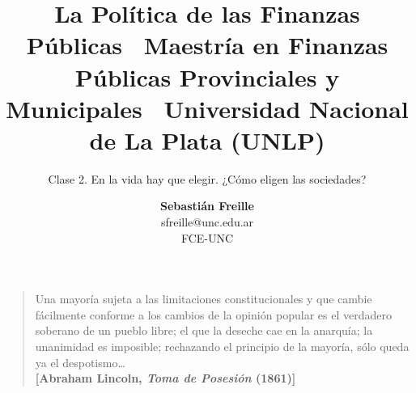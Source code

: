 \documentclass[
  ignorenonframetext,
]{beamer}
\title{La Política de las Finanzas Públicas ~Maestría en Finanzas
Públicas Provinciales y Municipales ~Universidad Nacional de La Plata
(UNLP)}
\subtitle{Clase 2. En la vida hay que elegir. ¿Cómo eligen las
sociedades?}
\author{\textbf{Sebastián Freille}\\
sfreille@unc.edu.ar\\
FCE-UNC}
\date{}
\begin{document}
\frame{\titlepage}
\ifdefined\Shaded\renewenvironment{Shaded}{\begin{tcolorbox}[borderline west={3pt}{0pt}{shadecolor}, boxrule=0pt, enhanced, sharp corners, breakable, frame hidden, interior hidden]}{\end{tcolorbox}}\fi

\begin{frame}
\begin{quote}
Una mayoría sujeta a las limitaciones constitucionales y que cambie
fácilmente conforme a los cambios de la opinión popular es el verdadero
soberano de un pueblo libre; el que la deseche cae en la anarquía; la
unanimidad es imposible; rechazando el principio de la mayoría, sólo
queda ya el despotismo\ldots{}\\
\textbf{{[}Abraham Lincoln, \emph{Toma de Posesión} (1861){]}}
\end{quote}
\end{frame}
\end{document}
